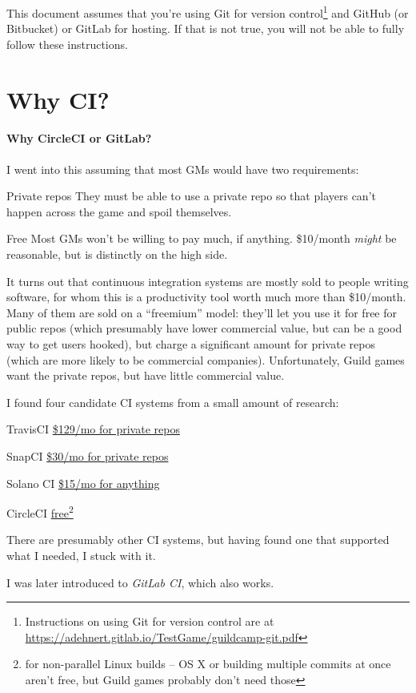 \documentclass[green]{testgame}
\begin{document}
\newcommand{\ter}[1]{\fbox{\parbox{6.5in}{{\tt #1}}}}
\newcommand{\GameTeX}{GameTeX}
\newcommand{\webbase}{https://adehnert.gitlab.io/TestGame}


This document assumes that you're using Git for version control\footnote{Instructions on using Git for version control are at \url{\webbase/guildcamp-git.pdf}} and GitHub (or Bitbucket) or GitLab for hosting. If that is not true, you will not be able to fully follow these instructions.

\section{Why CI?}

\begin{WrapText}
  \paragraph*{Why CircleCI or GitLab?} I went into this assuming that most GMs would have two requirements:
  \begin{desc}
  \item[Private repos] They must be able to use a private repo so that players can't happen across the game and spoil themselves.
  \item[Free] Most GMs won't be willing to pay much, if anything. \$10/month \emph{might} be reasonable, but is distinctly on the high side.
  \end{desc}

  It turns out that continuous integration systems are mostly sold to people writing software, for whom this is a productivity tool worth much more than \$10/month. Many of them are sold on a ``freemium'' model: they'll let you use it for free for public repos (which presumably have lower commercial value, but can be a good way to get users hooked), but charge a significant amount for private repos (which are more likely to be commercial companies). Unfortunately, Guild games want the private repos, but have little commercial value.

  I found four candidate CI systems from a small amount of research:
  \begin{desc}
  \item[TravisCI] \href{https://travis-ci.com/plans}{\$129/mo for private repos}
  \item[SnapCI] \href{https://snap-ci.com/my_plans/}{\$30/mo for private repos}
  \item[Solano CI] \href{https://www.solanolabs.com/#pricing}{\$15/mo for anything}
  \item[CircleCI] \href{https://circleci.com/pricing/}{free\footnote{for non-parallel Linux builds -- OS X or building multiple commits at once aren't free, but Guild games probably don't need those}}
  \end{desc}

  There are presumably other CI systems, but having found one that supported what I needed, I stuck with it.

  I was later introduced to \emph{GitLab CI}, which also works.
\end{WrapText}
\end{document}
